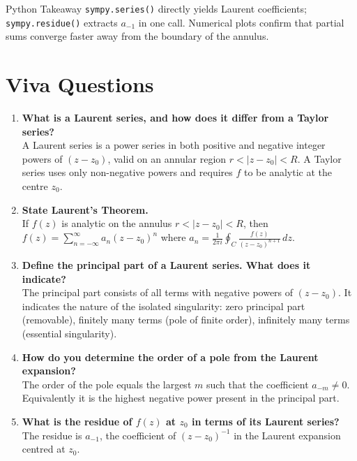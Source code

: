 \documentclass[12pt,a4paper]{article}
\begin{document}
\begin{learnbox}{Python Takeaway}
\texttt{sympy.series()} directly yields Laurent coefficients; \texttt{sympy.residue()} extracts
$a_{-1}$ in one call. Numerical plots confirm that partial sums converge faster away from the
boundary of the annulus.
\end{learnbox}

\section{Viva Questions}

\begin{enumerate}[label=\textbf{Q\arabic*.}]

\item \textbf{What is a Laurent series, and how does it differ from a Taylor series?}\\
A Laurent series is a power series in both positive and negative integer powers of $(z-z_0)$,
valid on an annular region $r < |z-z_0| < R$. A Taylor series uses only non-negative powers
and requires $f$ to be analytic at the centre $z_0$.

\item \textbf{State Laurent's Theorem.}\\
If $f(z)$ is analytic on the annulus $r < |z-z_0| < R$, then
$f(z) = \sum_{n=-\infty}^{\infty} a_n(z-z_0)^n$ where
$a_n = \frac{1}{2\pi i}\oint_C \frac{f(z)}{(z-z_0)^{n+1}}\,dz$.

\item \textbf{Define the principal part of a Laurent series. What does it indicate?}\\
The principal part consists of all terms with negative powers of $(z-z_0)$.
It indicates the nature of the isolated singularity: zero principal part (removable),
finitely many terms (pole of finite order), infinitely many terms (essential singularity).

\item \textbf{How do you determine the order of a pole from the Laurent expansion?}\\
The order of the pole equals the largest $m$ such that the coefficient $a_{-m} \neq 0$.
Equivalently it is the highest negative power present in the principal part.

\item \textbf{What is the residue of $f(z)$ at $z_0$ in terms of its Laurent series?}\\
The residue is $a_{-1}$, the coefficient of $(z-z_0)^{-1}$ in the Laurent expansion centred at $z_0$.


\end{enumerate}
\end{document}
